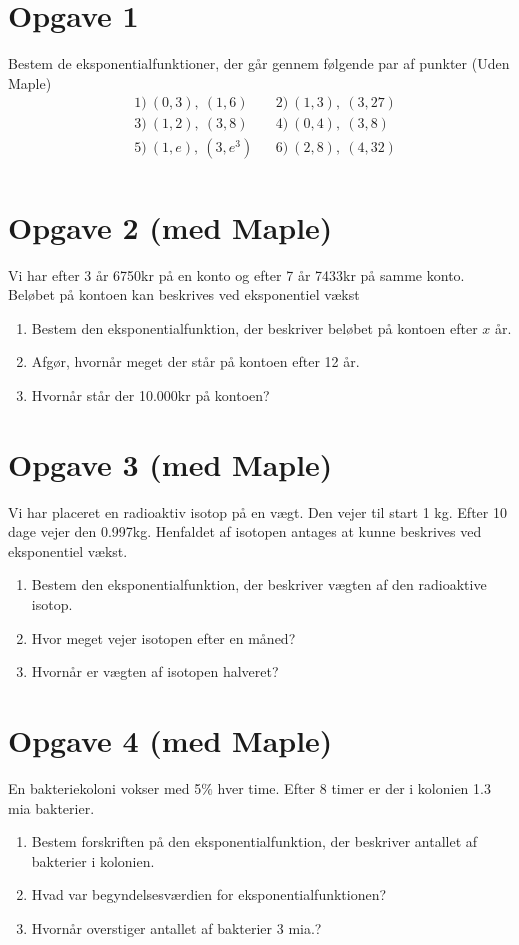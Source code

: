 \section*{Opgave 1}
Bestem de eksponentialfunktioner, der går gennem følgende par af punkter (Uden Maple)
\begin{align*}
&1) \ (0,3), \ (1,6)  &&2) \ (1,3), \ (3,27)      \\
&3) \ (1,2), \  (3,8)   &&4) \  (0,4), \ (3,8)    \\
&5) \ (1,e), \ (3,e^3)   &&6) \ (2,8),\  (4,32)       \\
\end{align*}

\section*{Opgave 2 (med Maple)}
Vi har efter 3 år 6750kr på en konto og efter 7 år 7433kr på samme konto. Beløbet på kontoen kan beskrives ved eksponentiel vækst
\begin{enumerate}[label=\roman*)]
	\item Bestem den eksponentialfunktion, der beskriver beløbet på kontoen efter $x$ år.
	\item Afgør, hvornår meget der står på kontoen efter 12 år.
	\item Hvornår står der 10.000kr på kontoen?
\end{enumerate}


\section*{Opgave 3 (med Maple)}
Vi har placeret en radioaktiv isotop på en vægt. Den vejer til start 1 kg. Efter 10 dage vejer den 0.997kg. Henfaldet af isotopen antages at kunne beskrives ved eksponentiel vækst.
\begin{enumerate}[label=\roman*)]
	\item  Bestem den eksponentialfunktion, der beskriver vægten af den radioaktive isotop.
	\item Hvor meget vejer isotopen efter en måned?
	\item Hvornår er vægten af isotopen halveret?
\end{enumerate}

\section*{Opgave 4 (med Maple)}
En bakteriekoloni vokser med 5$\%$ hver time. Efter 8 timer er der i kolonien 1.3 mia bakterier. 
\begin{enumerate}[label=\roman*)]
	\item Bestem forskriften på den eksponentialfunktion, der beskriver antallet af bakterier i kolonien. 
	\item Hvad var begyndelsesværdien for eksponentialfunktionen?
	\item Hvornår overstiger antallet af bakterier 3 mia.?
\end{enumerate}

